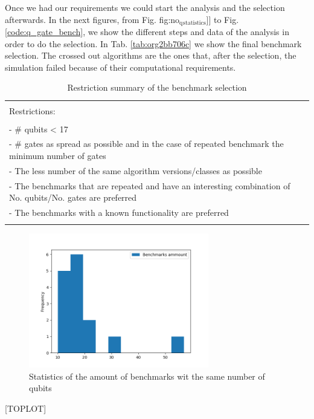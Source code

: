 Once we had our requirements we could start the analysis and the selection afterwards.
In the next figures, from Fig. fig:no\(_{\text{q}}\)\(_{\text{statistics}}\)]] to Fig. \ref{code:q_gate_bench}, we show the different steps and data of the analysis in order to do the selection.
In Tab. \ref{tab:org2bb706c} we show the final benchmark selection.
The crossed out algorithms are the ones that, after the selection, the simulation failed because of their computational requirements.
\begin{table}[htbp]
\caption{\label{tab:orgc7df89f}
Restriction summary of the benchmark selection}
\centering
\begin{tabular}{|l|}
\hline
\\
Restrictions:\\
\\
- \# qubits < 17\\
- \# gates as spread as possible and in the case of repeated benchmark the minimum number of gates\\
- The less number of the same algorithm versions/classes as possible\\
- The benchmarks that are repeated and have an interesting combination of No. qubits/No. gates are  preferred\\
- The benchmarks with a known functionality are preferred\\
\\
\hline
\end{tabular}
\end{table}
\begin{figure}[htbp]
\centering
\includegraphics[width=0.7\textwidth]{../figures/number_of_benchmarks_depending_on_the_number_of_qubits.png}
\caption{\label{fig:org7f1bbc2}
Statistics of the amount of benchmarks wit the same number of qubits}
\end{figure}
[TOPLOT]

